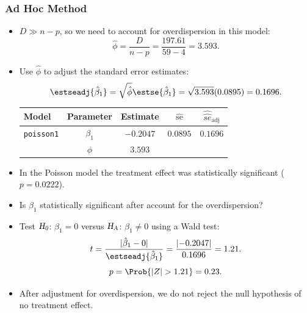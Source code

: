 \documentclass[oneside]{book}\usepackage[]{graphicx}\usepackage[svgnames]{xcolor}
\newcommand{\HN}{\textsl{H}_{\textsl{0}}}%
\newcommand{\HA}{\textsl{H}_{\textsl{A}}}%
\DeclarePairedDelimiter\abs{\lvert}{\rvert}
\begin{document}
\subsubsection*{Ad Hoc Method}
\begin{itemize}
      \item $ D\gg n-p $, so we need to account for overdispersion in this model:
            \[ \hat{\phi}=\frac{D}{n-p}=\frac{197.61}{59-4}=3.593. \]
      \item Use $ \hat{\phi} $ to adjust the standard error estimates:
            \[ \estseadj{\hat{\beta}_1}=\sqrt{\hat{\phi}}\estse{\hat{\beta}_1}=\sqrt{3.593}(0.0895)=0.1696. \]
            \begin{table}[H]
                  \centering
                  \begin{tabular}{lcccc}
                        Model             & Parameter   & Estimate    & $ \hat{\text{se}} $ & $ \widehat{\hat{se}}_{\text{adj}} $ \\
                        \midrule
                        \texttt{poisson1} & $ \beta_1 $ & $ -0.2047 $ & $ 0.0895 $          & $0.1696$                            \\
                                          & $ \phi $    & $3.593$                                                                 \\
                        \bottomrule
                  \end{tabular}
            \end{table}
      \item In the Poisson model the treatment effect was statistically significant ($ p=0.0222 $).
      \item Is $ \beta_1 $ statistically significant after account for the overdispersion?
      \item Test $ \HN $: $ \beta_1=0 $ versus $ \HA $: $ \beta_1\ne 0 $ using a Wald test:
            \[ t=\frac{\abs{\hat{\beta}_1-0}}{\estseadj{\hat{\beta}_1}}=\frac{\abs{-0.2047}}{0.1696}=1.21. \]
            \[ p=\Prob{\abs{Z}>1.21}=0.23. \]
      \item After adjustment for overdispersion, we do not reject the null hypothesis of no
            treatment effect.
\end{itemize}
\end{document}
